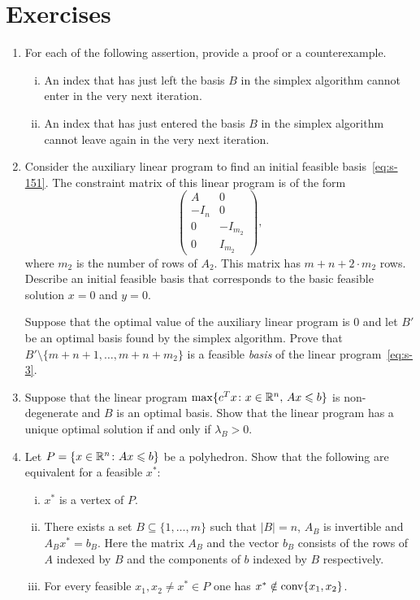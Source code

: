 \section*{Exercises} 
\begin{enumerate}
\item For each of the following assertion, provide a proof or a counterexample. 
  \begin{enumerate}[i)]
  \item An index that has just left the basis $B$ in the simplex
    algorithm cannot enter in the very next iteration.
  \item An index that has just entered the basis $B$ in the simplex
    algorithm cannot leave again in the very next iteration. 
  \end{enumerate}
\item Consider the auxiliary linear program to find an initial feasible basis~\eqref{eq:s-151}. The constraint matrix of this linear program is of the form
  \begin{displaymath}
    \begin{pmatrix}
      A & 0 \\
      -I_n & 0\\ 
      0 & -I_{m_2}\\
      0 & I_{m_2}
    \end{pmatrix},
  \end{displaymath}
  where $m_2$ is the number of rows of $A_2$. This matrix has $m+n+2\cdot m_2$ rows. Describe an initial feasible basis that corresponds to the basic feasible solution $x = 0$ and $y=0$. 

Suppose that the optimal value of the auxiliary linear program is $0$ and let $B'$   be an optimal basis found by the simplex algorithm. Prove that $B' \setminus \{m+n+1,\dots,m+n+m_2\}$ is a feasible \emph{basis} of the linear program~\eqref{eq:s-3}. 

\item Suppose that the linear program $\max \{c^Tx \colon x \in \mathbb{R}^n, \, Ax \leqslant b\}$ is non-degenerate and $B$ is an optimal basis. Show that the linear program has a unique optimal solution if and only if $\lambda_B>0$. 

\item Let $P = \{ x \in \mathbb{R}^n \colon Ax\leqslant b\}$ be a polyhedron. Show that the
  following are equivalent for a feasible $x^*$:
  \begin{enumerate}[i)] 
  \item $x^*$ is a vertex of $P$. 
  \item There exists a set $B\subseteq \{1,\ldots,m\}$ such that $|B| = n$, $A_B$  is
    invertible and $A_B x^* = b_B$. Here the matrix $A_B$ and the
    vector $b_B$ consists of the rows of $A$ indexed by $B$ and the
    components of $b$ indexed by $B$ respectively. 
  \item For every feasible $x_1, x_2 \neq x^* \in P$ one has $x^* \notin
    \operatorname{conv}\{x_1,x_2\}$. 
  \end{enumerate}  \label{i:item:1} 


\end{enumerate}
